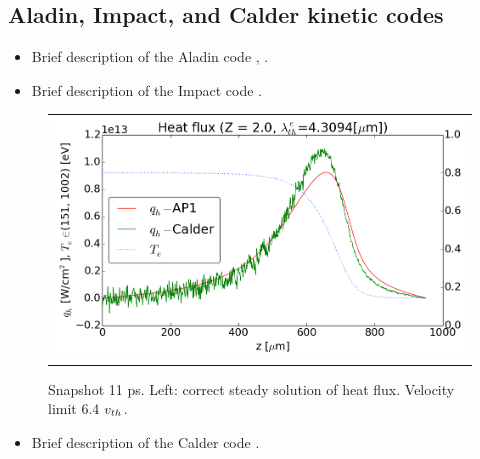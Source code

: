 \subsection{Aladin, Impact, and Calder kinetic codes}
\label{sec:AladinImpactCaldercodes}

\begin{itemize}
  \item Brief description of the Aladin code , . %
\end{itemize}

\begin{itemize}
  \item Brief description of the Impact code .
\end{itemize}

\begin{figure}[tbh]
  \begin{center}
    \begin{tabular}{c}
      \includegraphics[width=\figscale\textwidth]{../VFPdata/C7_Calder_case1_heatflux.png} 
    \end{tabular}
  \caption{  
  Snapshot 11 ps. Left: correct steady solution of heat flux. 
  Velocity limit 6.4 $v_{th}$.
  }
  \label{fig:C7_Calder_case1}
  \end{center} 
\end{figure}

\begin{itemize}
  \item Brief description of the Calder code .
\end{itemize}

